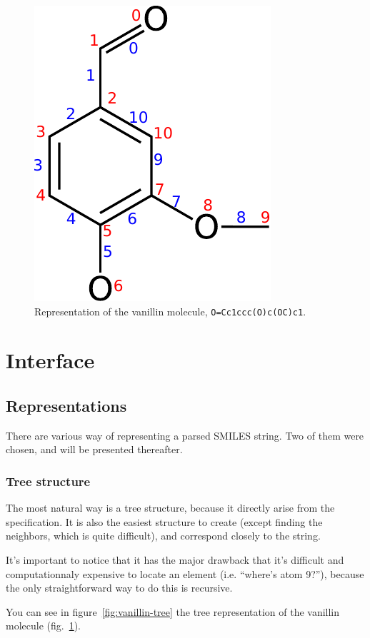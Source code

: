 \documentclass[a4paper, 11pt]{article}
\begin{document}
\begin{figure}[H]
    \begin{center}
        \includegraphics[width=0.4\columnwidth]{images/Vanillin.pdf}
    \end{center}
    \caption[Vanillin molecule]{\label{fig:vanillin} Representation of the vanillin molecule, {\tt O=Cc1ccc(O)c(OC)c1}.}
\end{figure}


\section{Interface}\label{sec:interface}


\subsection{Representations}

There are various way of representing a parsed SMILES string. Two of them were chosen, and will be presented thereafter.

\subsubsection{Tree structure}

The most natural way is a tree structure, because it directly arise from the specification. It is also the easiest structure to create (except finding the neighbors, which is quite difficult), and correspond closely to the string.

It's important to notice that it has the major drawback that it's difficult and computationnaly expensive to locate an element (i.e. ``where's atom 9?''), because the only straightforward way to do this is recursive.

You can see in figure~\ref{fig:vanillin-tree} the tree representation of the vanillin molecule (fig.~\ref{fig:vanillin}).
\end{document}
